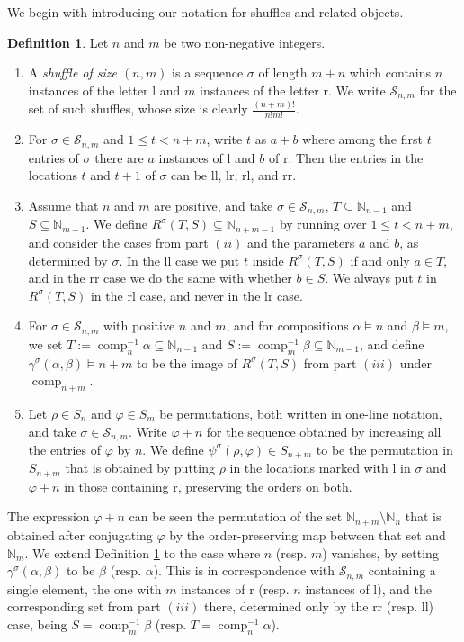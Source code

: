\documentclass{article}
\theoremstyle{definition}
\newtheorem{defn}[thm]{Definition}
\begin{document}
We begin with introducing our notation for shuffles and related objects.
\begin{defn}
Let $n$ and $m$ be two non-negative integers.
\begin{enumerate}[$(i)$]
\item A \emph{shuffle of size $(n,m)$} is a sequence $\sigma$ of length $m+n$ which contains $n$ instances of the letter l and $m$ instances of the letter r. We write $\mathcal{S}_{n,m}$ for the set of such shuffles, whose size is clearly $\frac{(n+m)!}{n!m!}$.
\item For $\sigma\in\mathcal{S}_{n,m}$ and $1 \leq t<n+m$, write $t$ as $a+b$ where among the first $t$ entries of $\sigma$ there are $a$ instances of l and $b$ of r. Then the entries in the locations $t$ and $t+1$ of $\sigma$ can be ll, lr, rl, and rr.
\item Assume that $n$ and $m$ are positive, and take $\sigma\in\mathcal{S}_{n,m}$, $T\subseteq\mathbb{N}_{n-1}$ and $S\subseteq\mathbb{N}_{m-1}$. We define $R^{\sigma}(T,S)\subseteq\mathbb{N}_{n+m-1}$ by running over $1 \leq t<n+m$, and consider the cases from part $(ii)$ and the parameters $a$ and $b$, as determined by $\sigma$. In the ll case we put $t$ inside $R^{\sigma}(T,S)$ if and only $a \in T$, and in the rr case we do the same with whether $b \in S$. We always put $t$ in $R^{\sigma}(T,S)$ in the rl case, and never in the lr case.
\item For $\sigma\in\mathcal{S}_{n,m}$ with positive $n$ and $m$, and for compositions $\alpha \vDash n$ and $\beta \vDash m$, we set $T:=\operatorname{comp}_{n}^{-1}\alpha\subseteq\mathbb{N}_{n-1}$ and $S:=\operatorname{comp}_{m}^{-1}\beta\subseteq\mathbb{N}_{m-1}$, and define $\gamma^{\sigma}(\alpha,\beta) \vDash n+m$ to be the image of $R^{\sigma}(T,S)$ from part $(iii)$ under
    $\operatorname{comp}_{n+m}$.
\item Let $\rho \in S_{n}$ and $\varphi \in S_{m}$ be permutations, both written in one-line notation, and take $\sigma\in\mathcal{S}_{n,m}$. Write $\varphi+n$ for the sequence obtained by increasing all the entries of $\varphi$ by $n$. We define $\psi^{\sigma}(\rho,\varphi) \in S_{n+m}$ to be the permutation in $S_{n+m}$ that is obtained by putting $\rho$ in the locations marked with l in $\sigma$ and $\varphi+n$ in those containing r, preserving the orders on both.
\end{enumerate} \label{shuffle}
\end{defn}
The expression $\varphi+n$ can be seen the permutation of the set $\mathbb{N}_{n+m}\setminus\mathbb{N}_{n}$ that is obtained after conjugating $\varphi$ by the order-preserving map between that set and $\mathbb{N}_{m}$. We extend Definition \ref{shuffle} to the case where $n$ (resp. $m$) vanishes, by setting $\gamma^{\sigma}(\alpha,\beta)$ to be $\beta$ (resp. $\alpha$). This is in correspondence with $\mathcal{S}_{n,m}$ containing a single element, the one with $m$ instances of r (resp. $n$ instances of l), and the corresponding set from part $(iii)$ there, determined only by the rr (resp. ll) case, being $S=\operatorname{comp}_{m}^{-1}\beta$ (resp. $T=\operatorname{comp}_{n}^{-1}\alpha$).
\end{document}
